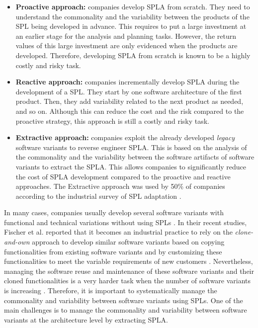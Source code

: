 \documentclass[graybox]{svmult}
\begin{document}
\begin{itemize}
\item \textbf{Proactive approach:} companies develop SPLA from scratch. They need to understand the commonality and the variability between the products of the SPL being developed in advance. This  requires to put a large investment at an earlier stage for the analysis and planning tasks. However, the return values of this large investment are only evidenced when the products are developed. Therefore, developing SPLA from scratch is known to be a highly costly and risky task. 

\item \textbf{Reactive approach:} companies incrementally develop SPLA during the development of a SPL. They start by one software architecture of the first product. Then, they add variability related to the next product as needed, and so on. Although this can reduce the cost and the risk compared to the proactive strategy, this approach is still a costly and risky task. 

\item \textbf{Extractive approach:} companies exploit the already developed \emph{legacy} software variants to reverse engineer SPLA. This is based on the analysis of the commonality and the variability between the software artifacts of software variants to extract the SPLA. This allows companies to significantly reduce the cost of SPLA development compared to the proactive and reactive approaches. The Extractive approach was used by 50\% of companies according to the industrial survey of SPL adaptation \cite{berger2013survey}. 
\end{itemize}

In many cases, companies usually develop several software variants with functional and technical variations without using SPLs \cite{dubinsky2013exploratory,fischer2014enhancing}. In their recent studies, Fischer et al. \cite{fischer2014enhancing} reported that it becomes an industrial practice to rely on the \textit{clone-and-own} approach to develop similar software variants based on copying functionalities from existing software variants and by customizing these functionalities to meet the variable requirements of new customers \cite{fischer2014enhancing}. Nevertheless, managing the software reuse and maintenance of these software variants and their cloned functionalities is a very harder task when the number of software variants is increasing \cite{dubinsky2013exploratory}. Therefore, it is important to systematically manage the commonality and variability between software variants using SPLs. One of the main challenges is to manage the commonality and variability between software variants at the architecture level by extracting SPLA. 
\end{document}
